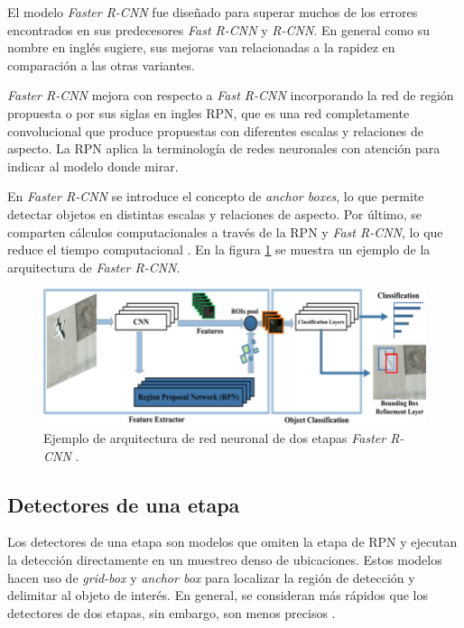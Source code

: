 El modelo \textit{Faster R-CNN} fue diseñado para superar muchos de los errores encontrados en sus predecesores \textit{Fast R-CNN} y \textit{R-CNN}. En general como su nombre en inglés sugiere, sus mejoras van relacionadas a la rapidez en comparación a las otras variantes.

\textit{Faster R-CNN} mejora con respecto a \textit{Fast R-CNN} incorporando la red de región propuesta o por sus siglas en ingles RPN, que es una red completamente convolucional que produce propuestas con diferentes escalas y relaciones de aspecto. La RPN aplica la terminología de redes neuronales con atención para indicar al modelo donde mirar.

En \textit{Faster R-CNN} se introduce el concepto de \textit{anchor boxes}, lo que permite detectar objetos en distintas escalas y relaciones de aspecto. Por último, se comparten cálculos computacionales a través de la RPN y \textit{Fast R-CNN}, lo que reduce el tiempo computacional \cite{ARTICLE:9}. En la figura \ref{fig:Faster-rcnn} se muestra un ejemplo de la arquitectura de \textit{Faster R-CNN}.

\begin{figure}[ht]
	\centering
	\includegraphics[scale=1.3]{./Figures/Faster-rcnn.png}
	\caption{Ejemplo de arquitectura de red neuronal de dos etapas \textit{Faster R-CNN} \cite{ARTICLE:11}.}
	\label{fig:Faster-rcnn}
\end{figure}

\subsection{Detectores de una etapa}

Los detectores de una etapa son modelos que omiten la etapa de RPN y ejecutan la detección directamente en un muestreo denso de ubicaciones. Estos modelos hacen uso de \textit{grid-box} y \textit{anchor box} para localizar la región de detección y delimitar al objeto de interés. En general, se consideran más rápidos que los detectores de dos etapas, sin embargo, son menos precisos \cite{ARTICLE:12}.

